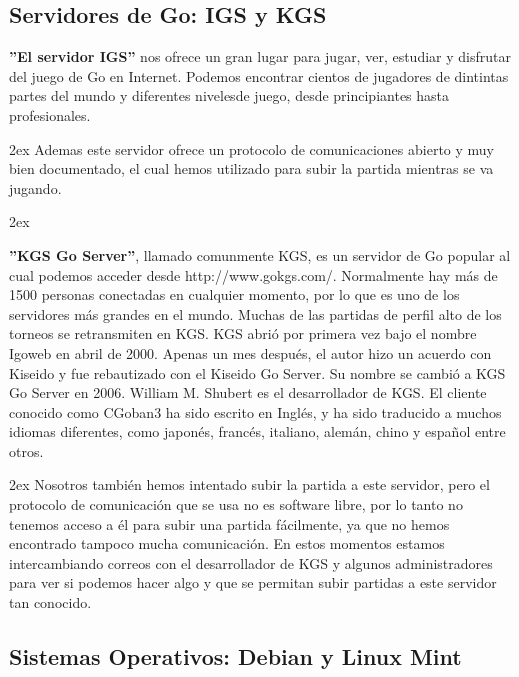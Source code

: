\documentclass[12pt,a4paper]{report}
\begin{document}
\subsection{Servidores de Go: IGS y KGS} %

\textbf{''El servidor IGS''} nos ofrece un gran lugar para jugar, ver, estudiar
y disfrutar del juego de Go en Internet. Podemos encontrar cientos de jugadores
de dintintas partes del mundo y diferentes nivelesde juego, desde principiantes
hasta profesionales. 

\parskip 2ex
Ademas este servidor ofrece un protocolo de comunicaciones abierto y muy bien
documentado, el cual hemos utilizado para subir la partida mientras se va
jugando. 

\parskip 2ex

\textbf{''KGS Go Server''}, llamado comunmente KGS, es un servidor de Go popular
al cual podemos acceder desde http://www.gokgs.com/. Normalmente hay más de 1500
personas conectadas en cualquier momento, por lo que es uno de los servidores
más grandes en el mundo. Muchas de las partidas de perfil alto de los torneos se
retransmiten en KGS. KGS abrió por primera vez bajo el nombre Igoweb en abril
de 2000.  Apenas un mes después, el autor hizo un acuerdo con Kiseido y fue
rebautizado con el Kiseido Go Server. Su nombre se cambió a KGS Go Server en
2006. William M. Shubert es el desarrollador de KGS. El cliente conocido como
CGoban3 ha sido escrito en Inglés, y ha sido traducido a muchos idiomas
diferentes, como japonés, francés, italiano, alemán, chino y español entre
otros. 

\parskip 2ex
Nosotros también hemos intentado subir la partida a este servidor, pero el
protocolo de comunicación que se usa no es software libre, por lo tanto no
tenemos acceso a él para subir una partida fácilmente, ya que no hemos
encontrado tampoco mucha comunicación. En estos momentos estamos intercambiando
correos con el desarrollador de KGS y algunos administradores para ver si
podemos hacer algo y que se permitan subir partidas a este servidor tan
conocido. 


\subsection{Sistemas Operativos: Debian y Linux Mint}
\end{document}
